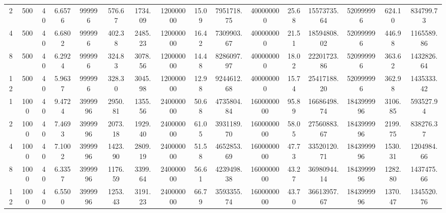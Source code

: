 \begin{landscape}
\begin{table}[h!]
\begin{tabularx}{\hsize}{cccccccccccccccc}
	2  & 500  & 40 & 6.6576 & 999996  & 576.67  & 1734.09 & 120000000 & 15.09 & 7951718.75  & 400000000  & 25.68 & 15573735.64 & 520999996  & 624.10  & 834799.73  \\
	4  & 500  & 40 & 6.6802 & 999996  & 402.38  & 2485.23 & 120000000 & 16.42 & 7309903.67  & 400000000  & 21.51 & 18594808.02 & 520999996  & 446.98  & 1165589.86 \\
	8  & 500  & 40 & 6.2924 & 999996  & 324.83  & 3078.56 & 120000000 & 14.48 & 8286097.97  & 400000000  & 18.02 & 22201723.86 & 520999996  & 363.62  & 1432826.64 \\
	12 & 500  & 40 & 5.9637 & 999996  & 328.30  & 3045.98 & 120000000 & 12.98 & 9244612.68  & 400000000  & 15.74 & 25417188.20 & 520999996  & 362.98  & 1435333.42 \\
	1  & 1000 & 40 & 9.4724 & 3999996 & 2950.81 & 1355.56 & 240000000 & 50.68 & 4735804.84  & 1600000000 & 95.89 & 16686498.74 & 1843999996 & 3106.85 & 593527.94  \\
	2  & 1000 & 40 & 7.4693 & 3999996 & 2073.18 & 1929.40 & 240000000 & 61.05 & 3931189.70  & 1600000000 & 58.05 & 27560883.67 & 1843999996 & 2199.75 & 838276.37  \\
	4  & 1000 & 40 & 7.1002 & 3999996 & 1423.90 & 2809.19 & 240000000 & 51.58 & 4652853.69  & 1600000000 & 47.73 & 33520120.71 & 1843999996 & 1530.31 & 1204984.66 \\
	8  & 1000 & 40 & 6.3357 & 3999996 & 1176.59 & 3399.64 & 240000000 & 56.61 & 4239498.38  & 1600000000 & 43.27 & 36980944.14 & 1843999996 & 1282.80 & 1437475.66 \\
	12 & 1000 & 40 & 6.5500 & 3999996 & 1253.43 & 3191.23 & 240000000 & 66.79 & 3593355.74  & 1600000000 & 43.70 & 36613957.67 & 1843999996 & 1370.47 & 1345520.76 \\
	\bottomrule
	\end{tabularx}
	\label{tab:anexo-performance}
	\end{table}
\end{landscape}

